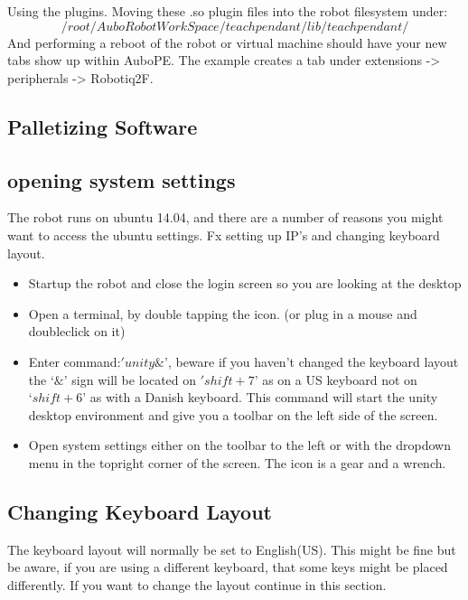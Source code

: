 \documentclass{article}
\begin{document}
Using the plugins.
Moving these .so plugin files into the robot filesystem under: $$/root/AuboRobotWorkSpace/teachpendant/lib/teachpendant/$$
And performing a reboot of the robot or virtual machine should have your new tabs show up within AuboPE. The example creates a tab under extensions -> peripherals -> Robotiq2F.


\subsection{Palletizing Software}

\subsection{opening system settings}
\label{subsec:OpenSystemSettings}
The robot runs on ubuntu 14.04, and there are a number of reasons you might want to access the ubuntu settings. Fx setting up IP's and changing keyboard layout. 

\begin{itemize}
	\item Startup the robot and close the login screen so you are looking at the desktop
	\item Open a terminal, by double tapping the icon. (or plug in a mouse and doubleclick on it)
	\item Enter command:$'unity\&’$, beware if you haven't changed the keyboard layout the $‘\&’$ sign will be located on $'shift+7’$ as on a US keyboard not on $‘shift+6’$ as with a Danish keyboard. This command will start the unity desktop environment and give you a toolbar on the left side of the screen.
	\item Open system settings either on the toolbar to the left or with the dropdown menu in the topright corner of the screen. The icon is a gear and a wrench. 
\end{itemize}

\subsection{Changing Keyboard Layout}
The keyboard layout will normally be set to English(US). This might be fine but be aware, if you are using a different keyboard, that some keys might be placed differently. If you want to change the layout continue in this section.
\end{document}
